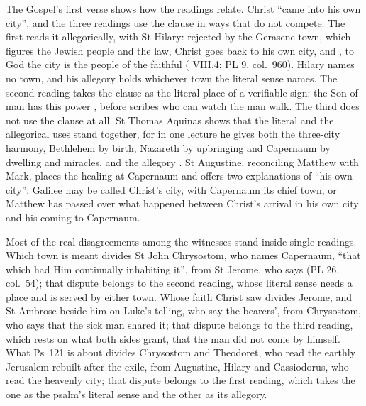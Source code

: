 The Gospel's first verse shows how the readings relate. Christ ``came into his
own city'', and the three readings use the clause in ways that do not compete.
The first reads it allegorically, with St Hilary: rejected by the Gerasene town,
which figures the Jewish people and the law, Christ goes back to his own city,
and , to God the city is the people of
the faithful ( VIII.4; PL 9, col.~960). Hilary names no town, and his
allegory holds whichever town the literal sense names. The second reading takes
the clause as the literal place of a verifiable sign: the Son of man has this
power , before scribes who can watch the man walk. The third
does not use the clause at all. St Thomas Aquinas shows that the literal and
the allegorical uses stand together, for in one lecture he gives both the
three-city harmony, Bethlehem by birth, Nazareth by upbringing and Capernaum by
dwelling and miracles, and the allegory . St Augustine, reconciling Matthew with Mark, places the healing at
Capernaum and offers two explanations of ``his own city'': Galilee may be
called Christ's city, with Capernaum its chief town, or Matthew has passed over
what happened between Christ's arrival in his own city and his coming to
Capernaum.

Most of the real disagreements among the witnesses stand inside single
readings. Which
town is meant divides St John Chrysostom, who names Capernaum, ``that which had
Him continually inhabiting it'', from St Jerome, who says  (PL 26, col.~54); that dispute belongs to
the second reading, whose literal sense needs a place and is served by either
town. Whose faith Christ saw divides Jerome, and St Ambrose beside him on
Luke's telling, who say the bearers', from Chrysostom, who says that the sick
man shared it; that dispute belongs to the third reading, which rests on what
both sides grant, that the man did not come by himself. What Ps~121 is about
divides Chrysostom and Theodoret, who read the earthly Jerusalem rebuilt after
the exile, from Augustine, Hilary and Cassiodorus, who read the heavenly city;
that dispute belongs to the first reading, which takes the one as the psalm's
literal sense and the other as its allegory.

